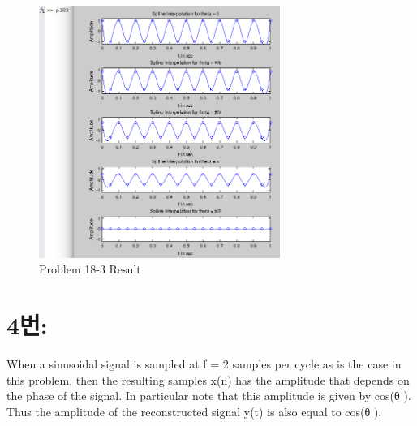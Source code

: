 \documentclass[11pt
  , a4paper
  , article
  , oneside
]{memoir}
\begin{document}
\begin{figure}[h!]
	\centering
	\includegraphics[width=0.7\textwidth,height=0.4\textwidth]{./images/p18-3.png}
	\caption{Problem 18-3 Result}
	\label{fig:Problem 18-3 Result}
\end{figure}

\section{4번: }
When a sinusoidal signal is sampled at f = 2 samples per cycle as is the case in this problem, then the resulting samples x(n) has the amplitude that depends on the phase of the signal. In particular note that this amplitude is given by cos(θ ). Thus the amplitude of the reconstructed signal y(t) is also equal to cos(θ ).
\end{document}
